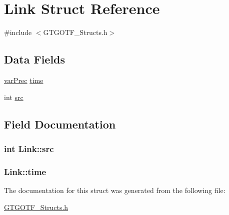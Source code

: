 \hypertarget{structLink}{\section{Link Struct Reference}
\label{structLink}
}


{\ttfamily \#include $<$G\-T\-G\-O\-T\-F\-\_\-\-Structs.\-h$>$}

\subsection*{Data Fields}
\begin{DoxyCompactItemize}
\item 
\hyperlink{group__type_gabda13d5bcd0cbdb094d655181a857e25}{var\-Prec} \hyperlink{structLink_a3dcf389af7a2d16eada1679d4ae33d13}{time}
\item 
int \hyperlink{structLink_a87fb6a54e52fc0c8cea06eafefc8b555}{src}
\end{DoxyCompactItemize}


\subsection{Field Documentation}
\hypertarget{structLink_a87fb6a54e52fc0c8cea06eafefc8b555}{
\subsubsection[{src}]{\setlength{\rightskip}{0pt plus 5cm}int Link\-::src}}\label{structLink_a87fb6a54e52fc0c8cea06eafefc8b555}
\hypertarget{structLink_a3dcf389af7a2d16eada1679d4ae33d13}{
\subsubsection[{time}]{ Link\-::time}}\label{structLink_a3dcf389af7a2d16eada1679d4ae33d13}


The documentation for this struct was generated from the following file\-:\begin{DoxyCompactItemize}
\item 
\hyperlink{GTGOTF__Structs_8h}{G\-T\-G\-O\-T\-F\-\_\-\-Structs.\-h}\end{DoxyCompactItemize}
